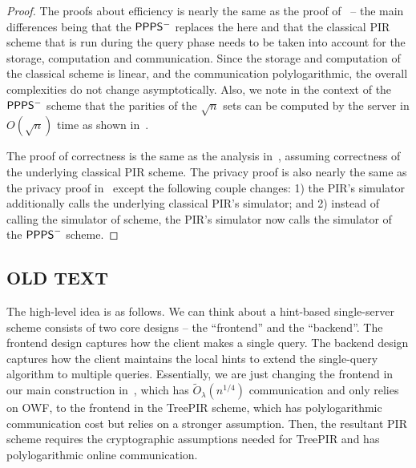 \begin{proof}
    The proofs about efficiency is nearly the same as the proof of~ -- the main differences being that the ${\sf PPPS^-}$ replaces the \ppps here and that the classical PIR scheme that is run during the query phase needs to be taken into account for the storage, computation and communication. Since the storage and computation of the classical scheme is linear, and the communication polylogarithmic, the overall complexities do not change asymptotically. Also, we note in the context of the $\sf{PPPS^-}$ scheme that the parities of the $\sqrt{n}$ sets can be computed by the server in $O(\sqrt{n})$ time as shown in~\cite{treepir}.

    The proof of correctness is the same as the analysis in~, 
assuming correctness of the underlying classical PIR scheme.
    The privacy proof is also nearly the same as the privacy proof in~ 
except the following couple changes:
1) the PIR's simulator additionally calls the underlying classical PIR's simulator;
and 2) instead of calling the simulator of \ppps scheme,  
the PIR's simulator now calls the simulator of the ${\sf PPPS}^-$ scheme.
\end{proof}



\iffalse
\subsection{\LARGE OLD TEXT}

The high-level idea is as follows.
We can think about a hint-based single-server scheme consists of two core designs -- the ``frontend'' and the ``backend''.
The frontend design captures how the client makes a single query.
The backend design captures how the client maintains the local hints to extend the single-query algorithm to multiple queries.
Essentially, we are just changing the frontend in our main construction in~, which has $\widetilde{O}_\lambda(n^{1/4})$ communication and only relies on OWF, to the frontend in the TreePIR scheme, which has polylogarithmic communication cost but relies on a stronger assumption. 
Then, the resultant PIR scheme requires the cryptographic assumptions needed for TreePIR and has polylogarithmic online communication.

